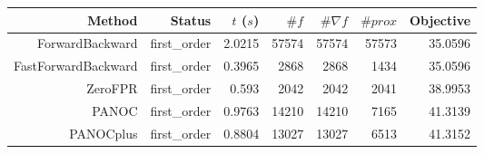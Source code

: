 \begin{tabular}{rrrrrrr}
  \toprule
  \textbf{Method} & \textbf{Status} & \textbf{$t$ ($s$)} & \textbf{$\#f$} & \textbf{$\#\nabla f$} & \textbf{$\#prox$} & \textbf{Objective} \\
  \midrule
  ForwardBackward & first\_order & 2.0215 & 57574 & 57574 & 57573 & 35.0596 \\
  FastForwardBackward & first\_order & 0.3965 & 2868 & 2868 & 1434 & 35.0596 \\
  ZeroFPR & first\_order & 0.593 & 2042 & 2042 & 2041 & 38.9953 \\
  PANOC & first\_order & 0.9763 & 14210 & 14210 & 7165 & 41.3139 \\
  PANOCplus & first\_order & 0.8804 & 13027 & 13027 & 6513 & 41.3152 \\
  \bottomrule
\end{tabular}
